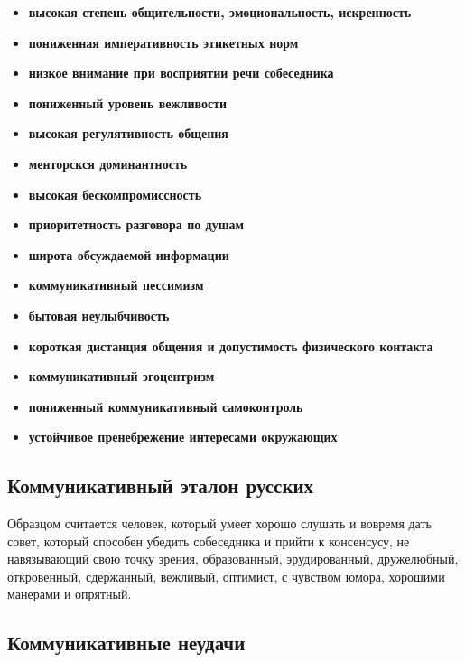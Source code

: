 \begin{itemize}
\item {\bfseries
\textmd{высокая степень общительности, эмоциональность, искренность}}
\item {\bfseries
\textmd{пониженная императивность этикетных норм}}
\item {\bfseries
\textmd{низкое внимание при восприятии речи собеседника}}
\item {\bfseries
\textmd{пониженный уровень вежливости}}
\item {\bfseries
\textmd{высокая регулятивность общения}}
\item {\bfseries
\textmd{менторскся доминантность}}
\item {\bfseries
\textmd{высокая бескомпромиссность}}
\item {\bfseries
\textmd{приоритетность разговора по душам}}
\item {\bfseries
\textmd{широта обсуждаемой информации}}
\item {\bfseries
\textmd{коммуникативный пессимизм}}
\item {\bfseries
\textmd{бытовая неулыбчивость}}
\item {\bfseries
\textmd{короткая дистанция общения и допустимость физического контакта}}
\item {\bfseries
\textmd{коммуникативный эгоцентризм}}
\item {\bfseries
\textmd{пониженный коммуникативный самоконтроль}}
\item {\bfseries
\textmd{устойчивое пренебрежение интересами окружающих}}
\end{itemize}

\subsection*{Коммуникативный эталон\textmd{ русских}}
 

Образцом считается человек, который умеет хорошо слушать и вовремя дать совет, который способен убедить
собеседника и прийти к консенсусу, не навязывающий свою точку зрения, образованный, эрудированный, дружелюбный,
откровенный, сдержанный, вежливый, оптимист, с чувством юмора, хорошими манерами и опрятный.

\subsection*{Коммуникативные неудачи}
 

